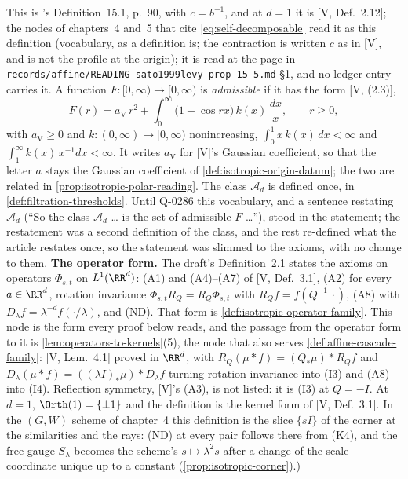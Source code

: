 \begin{definition}
{This is 's Definition~15.1, p.~90, with $c = b^{-1}$, and at $d = 1$ it is
[V, Def.~2.12]; the nodes of chapters~4 and~5 that cite \ref{eq:self-decomposable} read it as this
definition (vocabulary, as a definition is; the contraction is written $c$ as in [V], and is not the
profile at the origin); it is read at the page in
\texttt{records/affine/READING-sato1999levy-prop-15-5.md} \S 1, and no ledger entry carries it. A
function $F : [0,\infty) \to [0,\infty)$ is \emph{admissible} if it has the form [V, (2.3)],
\begin{equation}\label{eq:admissible-line}
  F(r) = a_{\mathrm V}\,r^2 + \int_0^\infty \bigl(1 - \cos rx\bigr)\,k(x)\,\frac{dx}{x}, \qquad r \ge 0,
\end{equation}
with $a_{\mathrm V} \ge 0$ and $k : (0,\infty) \to [0,\infty)$ nonincreasing,
$\int_0^1 x\,k(x)\,dx < \infty$ and $\int_1^\infty k(x)\,x^{-1}dx < \infty$. It writes
$a_{\mathrm V}$ for [V]'s Gaussian coefficient, so that the letter $a$ stays the Gaussian
coefficient of \ref{def:isotropic-origin-datum}; the two are related in
\ref{prop:isotropic-polar-reading}. The class $\mathcal{A}_d$ is defined once, in
\ref{def:filtration-thresholds}. Until Q-0286 this vocabulary, and a sentence restating
$\mathcal{A}_d$ (``So the class $\mathcal{A}_d$ \dots{} is the set of admissible $F$ \dots''),
stood in the statement; the restatement was a second definition of the class, and the rest
re-defined what the article restates once, so the statement was slimmed to the axioms, with no
change to them. \textbf{The operator form.} The draft's Definition~2.1 states the axioms on
operators $\Phi_{s,t}$ on $L^1(\RR^d)$: (A1) and (A4)--(A7) of [V, Def.~3.1], (A2) for every
$a \in \RR^d$, rotation invariance $\Phi_{s,t}R_Q = R_Q\Phi_{s,t}$ with $R_Qf = f(Q^{-1}\,\cdot)$,
(A8) with $D_\lambda f = \lambda^{-d}f(\cdot/\lambda)$, and (ND). That form is
\ref{def:isotropic-operator-family}. This node is the form every proof
below reads, and the passage from the operator form to it is
\ref{lem:operators-to-kernels}(5), the node that also serves \ref{def:affine-cascade-family}:
[V, Lem.~4.1] proved in $\RR^d$, with $R_Q(\mu * f) = (Q_*\mu) * R_Qf$ and
$D_\lambda(\mu * f) = ((\lambda I)_*\mu) * D_\lambda f$ turning rotation invariance into (I3) and
(A8) into (I4). Reflection symmetry, [V]'s (A3), is not listed: it is (I3) at $Q = -I$. At $d = 1$,
$\Orth(1) = \{\pm1\}$ and the definition is the kernel form of [V, Def.~3.1]. In the
$(G, W)$ scheme of chapter~4 this definition is the slice $\{sI\}$ of the corner at the similarities
and the rays: (ND) at every pair follows there from (K4), and the free gauge $S_\lambda$ becomes the
scheme's $s \mapsto \lambda^2 s$ after a change of the scale coordinate unique up to a constant
(\ref{prop:isotropic-corner}).)}
\end{definition}


